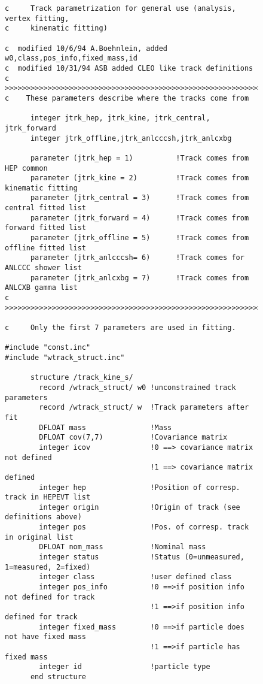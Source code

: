 \begin{figure}
\begin{tt}
\begin{verbatim}
c     Track parametrization for general use (analysis, vertex fitting,
c     kinematic fitting)

c  modified 10/6/94 A.Boehnlein, added w0,class,pos_info,fixed_mass,id
c  modified 10/31/94 ASB added CLEO like track definitions 
c  >>>>>>>>>>>>>>>>>>>>>>>>>>>>>>>>>>>>>>>>>>>>>>>>>>>>>>>>>>>>>>>>>>>>>>>>>>
c    These parameters describe where the tracks come from

      integer jtrk_hep, jtrk_kine, jtrk_central, jtrk_forward
      integer jtrk_offline,jtrk_anlcccsh,jtrk_anlcxbg

      parameter (jtrk_hep = 1)          !Track comes from HEP common
      parameter (jtrk_kine = 2)         !Track comes from kinematic fitting
      parameter (jtrk_central = 3)      !Track comes from central fitted list
      parameter (jtrk_forward = 4)      !Track comes from forward fitted list
      parameter (jtrk_offline = 5)      !Track comes from offline fitted list
      parameter (jtrk_anlcccsh= 6)      !Track comes for ANLCCC shower list
      parameter (jtrk_anlcxbg = 7)      !Track comes from ANLCXB gamma list
c  >>>>>>>>>>>>>>>>>>>>>>>>>>>>>>>>>>>>>>>>>>>>>>>>>>>>>>>>>>>>>>>>>>>>>>>>>>

c     Only the first 7 parameters are used in fitting.

#include "const.inc"
#include "wtrack_struct.inc"

      structure /track_kine_s/
        record /wtrack_struct/ w0 !unconstrained track parameters
        record /wtrack_struct/ w  !Track parameters after fit
        DFLOAT mass               !Mass
        DFLOAT cov(7,7)           !Covariance matrix
        integer icov              !0 ==> covariance matrix not defined
                                  !1 ==> covariance matrix defined
        integer hep               !Position of corresp. track in HEPEVT list
        integer origin            !Origin of track (see definitions above)
        integer pos               !Pos. of corresp. track in original list
        DFLOAT nom_mass           !Nominal mass
        integer status            !Status (0=unmeasured, 1=measured, 2=fixed)
        integer class             !user defined class       
        integer pos_info          !0 ==>if position info not defined for track
                                  !1 ==>if position info defined for track
        integer fixed_mass        !0 ==>if particle does not have fixed mass
                                  !1 ==>if particle has fixed mass
        integer id                !particle type                           
      end structure

\end{verbatim}
\end{tt}
\label{code:trkkine}
\end{figure}



